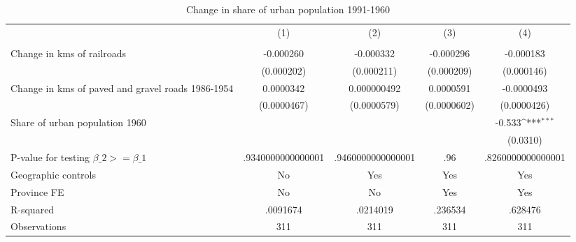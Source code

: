 \begin{table}[htbp]\centering
\def\sym#1{\ifmmode^{#1}\else\(^{#1}\)\fi}
\caption{Change in share of urban population 1991-1960}
\begin{tabular}{l*{4}{c}}
\hline\hline
                &\multicolumn{1}{c}{(1)}&\multicolumn{1}{c}{(2)}&\multicolumn{1}{c}{(3)}&\multicolumn{1}{c}{(4)}\\
                &\multicolumn{1}{c}{}&\multicolumn{1}{c}{}&\multicolumn{1}{c}{}&\multicolumn{1}{c}{}\\
\hline
Change in kms of railroads&-0.000260         &-0.000332         &-0.000296         &-0.000183         \\
                &(0.000202)         &(0.000211)         &(0.000209)         &(0.000146)         \\
[1em]
Change in kms of paved and gravel roads 1986-1954&0.0000342         &0.000000492         &0.0000591         &-0.0000493         \\
                &(0.0000467)         &(0.0000579)         &(0.0000602)         &(0.0000426)         \\
[1em]
Share of urban population 1960&                  &                  &                  &   -0.533\sym{***}\\
                &                  &                  &                  & (0.0310)         \\
\hline
P-value for testing $\beta\_{2} >= \beta\_{1}$&.9340000000000001         &.9460000000000001         &      .96         &.8260000000000001         \\
Geographic controls&       No         &      Yes         &      Yes         &      Yes         \\
Province FE     &       No         &       No         &      Yes         &      Yes         \\
R-squared       & .0091674         & .0214019         &  .236534         &  .628476         \\
Observations    &      311         &      311         &      311         &      311         \\
\hline\hline
\end{tabular}
\end{table}
